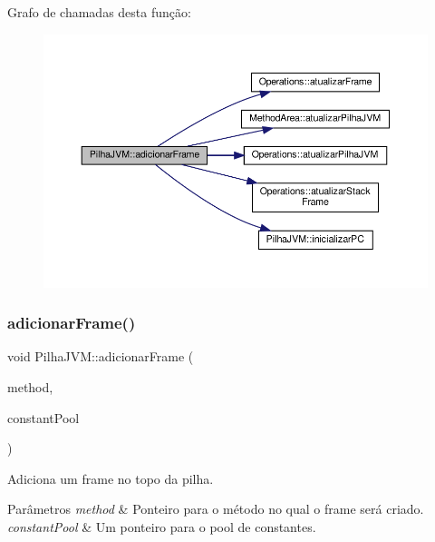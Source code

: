 Grafo de chamadas desta função\+:
\nopagebreak
\begin{figure}[H]
\begin{center}
\leavevmode
\includegraphics[width=350pt]{classPilhaJVM_a9add990f9c258d39d2fcd791398c96ac_cgraph}
\end{center}
\end{figure}
\mbox{\label{classPilhaJVM_a6a47624a1e9923e59258454e6e6d1271}} 
\subsubsection{\texorpdfstring{adicionar\+Frame()}{adicionarFrame()}\hspace{0.1cm}{\footnotesize\ttfamily [2/2]}}
{\footnotesize\ttfamily void Pilha\+J\+V\+M\+::adicionar\+Frame (\begin{DoxyParamCaption}\item[{\hyperlink{structMethod__info}{Method\+\_\+info} $\ast$}]{method,  }\item[{\hyperlink{structCp__info}{Cp\+\_\+info} $\ast$}]{constant\+Pool }\end{DoxyParamCaption})}



Adiciona um frame no topo da pilha. 


\begin{DoxyParams}{Parâmetros}
{\em method} & Ponteiro para o método no qual o frame será criado. \\
\hline
{\em constant\+Pool} & Um ponteiro para o pool de constantes. \\
\hline
\end{DoxyParams}


